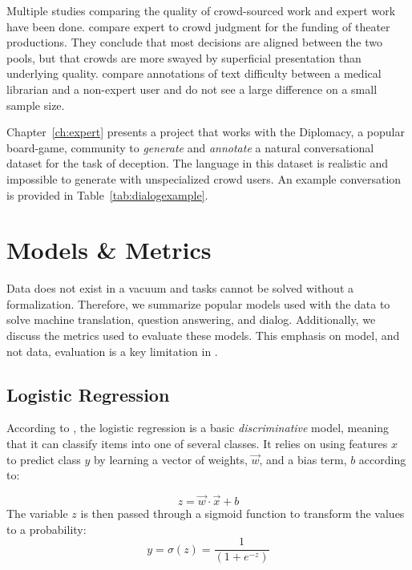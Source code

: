 %

Multiple studies comparing the quality of crowd-sourced work and expert work have been done.  
%
\citet{Mollick2016WisdomOM} compare expert to crowd judgment for the funding of theater productions.  
%
They conclude that most decisions are aligned between the two pools, but that crowds are more swayed by superficial presentation than underlying quality.   
%
\citet{leroy2012combining} compare annotations of text difficulty between a medical librarian and a non-expert user and do not see a large difference on a small sample size.  

Chapter~\ref{ch:expert} presents a project that works with the Diplomacy, a popular board-game, community to \textit{generate} and \textit{annotate} a natural conversational dataset for the task of deception.
%
The language in this dataset is realistic and impossible to generate with unspecialized crowd users.  
%
An example conversation is provided in Table~\ref{tab:dialogexample}.

\section{Models \& Metrics}
\label{sec:bgmodels}

Data does not exist in a vacuum and tasks cannot be solved without a formalization. 
%
Therefore, we summarize popular models used with the data to solve machine translation, question answering, and dialog.  
%
Additionally, we discuss the metrics used to evaluate these models.  
%
This emphasis on model, and not data, evaluation is a key limitation in \nlp{}.


\subsection{Logistic Regression}
\label{sec:lr}

According to \citet{ng2002discriminative}, the logistic regression is a basic \textit{discriminative} model, meaning that it can classify items into one of several classes.  
%
It relies on using features $x$ to predict class $y$ by learning a vector of weights, $\vec{w}$, and a bias term, $b$ according to:

\begin{equation}
z=\vec{w}\cdot{}\vec{x}+b
\end{equation}
The variable $z$ is then passed through a sigmoid function to transform the values to a probability:
\begin{equation}
y = \sigma(z) = \frac{1}{(1+e^{-z})}
\end{equation}

